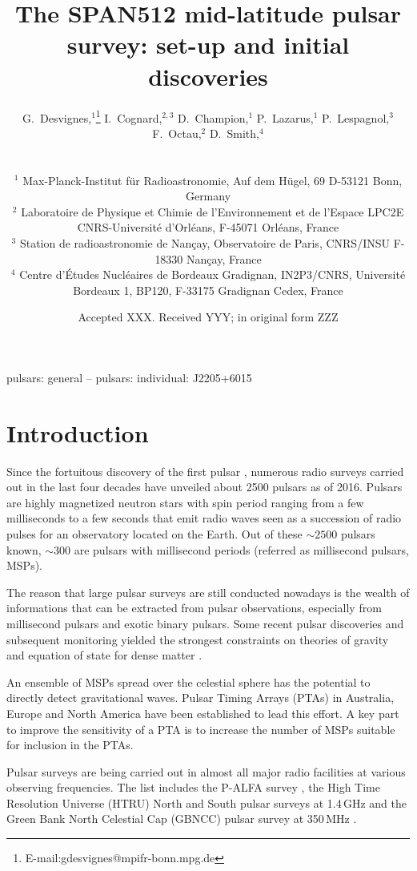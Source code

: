\documentclass[a4paper,fleqn,usenatbib]{mnras}
\title[SPAN512]{The SPAN512 mid-latitude pulsar survey: set-up and initial discoveries}
\author[G. Desvignes et al.]{\parbox{\textwidth}{G.~Desvignes,$^{1}$\thanks{E-mail:gdesvignes@mpifr-bonn.mpg.de}
 I.~Cognard,$^{2,3}$
 D.~Champion,$^{1}$
 P.~Lazarus,$^{1}$
 P.~Lespagnol,$^{3}$
 F.~Octau,$^{2}$
 D.~Smith,$^{4}$
 }
\vspace{0.4cm} \\ 
\parbox{\textwidth}{
$^{1}$ Max-Planck-Institut f\"ur Radioastronomie, Auf dem H\"ugel, 69 D-53121 Bonn, Germany\\
$^{2}$ Laboratoire de Physique et Chimie de l'Environnement et de l'Espace LPC2E CNRS-Universit{\'e} d'Orl{\'e}ans, F-45071 Orl{\'e}ans, France\\
$^{3}$ Station de radioastronomie de Nan{\c c}ay, Observatoire de Paris, CNRS/INSU F-18330 Nan{\c c}ay, France\\
$^{4}$ Centre d'\'Etudes Nucl\'eaires de Bordeaux Gradignan, IN2P3/CNRS, Universit\'e Bordeaux 1, BP120, F-33175 Gradignan Cedex, France
}
}
\date{Accepted XXX. Received YYY; in original form ZZZ}
\begin{document}
\label{firstpage}
\pagerange{\pageref{firstpage}--\pageref{lastpage}}
\maketitle

\begin{abstract}

\end{abstract}

\begin{keywords}
pulsars: general -- pulsars: individual: J2205+6015
\end{keywords}

\section{Introduction}

Since the fortuitous discovery of the first pulsar \citep{hbp+68},
numerous radio surveys carried out in the last four decades
have unveiled about 2500 pulsars as of 2016.  Pulsars are highly
magnetized neutron stars with spin period ranging from a few
milliseconds to a few seconds that emit radio waves seen as a
succession of radio pulses for an observatory located on the Earth.
Out of these $\sim 2500$ pulsars known, $\sim 300$ are pulsars with millisecond
periods (referred as millisecond pulsars, MSPs).

The reason that large pulsar surveys are still conducted nowadays is
the wealth of informations that can be extracted from pulsar
observations, especially from millisecond pulsars and exotic binary
pulsars.  Some recent pulsar discoveries and subsequent monitoring
yielded the strongest constraints on theories of gravity \cite[PSR
  J0737$-$3039A/B,][]{ksm+06} and equation of state for dense matter
\citep[][]{af}.

An ensemble of MSPs spread over the celestial sphere has the potential
to directly detect gravitational waves. Pulsar Timing Arrays (PTAs) in
Australia, Europe and North America have been established to lead this
effort. A key part to improve the sensitivity of a PTA is to increase
the number of MSPs suitable for inclusion in the PTAs.

Pulsar surveys are being carried out in almost all major radio
facilities at various observing frequencies. The list includes the
P-ALFA survey \citep{cfl+06,lbh+15}, the High Time Resolution Universe
(HTRU) North \citep{bck+13} and South \citep{kjs+10} pulsar surveys at 1.4\,GHz
and the Green Bank North Celestial Cap (GBNCC) pulsar survey at 350\,MHz \citep{slr+14}.
\end{document}
